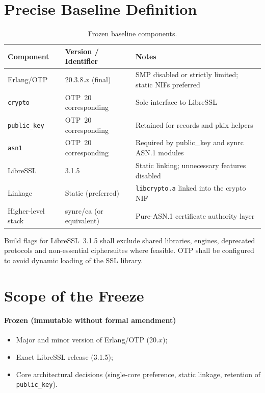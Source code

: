 \documentclass{article}
\begin{document}
\newpage
\section{Precise Baseline Definition}
\label{sec:baseline}

\begin{table}[ht]
\centering
\begin{tabular}{@{}llp{6.2cm}@{}}
\toprule
\textbf{Component} & \textbf{Version / Identifier} & \textbf{Notes} \\
\midrule
Erlang/OTP              & 20.3.8.$x$ (final)          & SMP disabled or strictly limited; static NIFs preferred \\
\texttt{crypto}         & OTP~20 corresponding       & Sole interface to LibreSSL \\
\texttt{public\_key}    & OTP~20 corresponding       & Retained for records and pkix helpers \\
\texttt{asn1}           & OTP~20 corresponding       & Required by public\_key and synrc ASN.1 modules \\
LibreSSL                & 3.1.5                      & Static linking; unnecessary features disabled \\
Linkage                 & Static (preferred)         & \texttt{libcrypto.a} linked into the crypto NIF \\
Higher-level stack      & synrc/ca (or equivalent)   & Pure-ASN.1 certificate authority layer \\
\bottomrule
\end{tabular}
\caption{Frozen baseline components.}
\label{tab:baseline}
\end{table}

Build flags for LibreSSL~3.1.5 shall exclude shared libraries, engines, deprecated protocols
and non-essential ciphersuites where feasible. OTP shall be configured to avoid dynamic
loading of the SSL library.

\section{Scope of the Freeze}
\label{sec:scope}

\paragraph{Frozen (immutable without formal amendment)}
\begin{itemize}
  \item Major and minor version of Erlang/OTP (20.$x$);
  \item Exact LibreSSL release (3.1.5);
  \item Core architectural decisions (single-core preference, static linkage, retention of \texttt{public\_key}).
\end{itemize}
\end{document}
